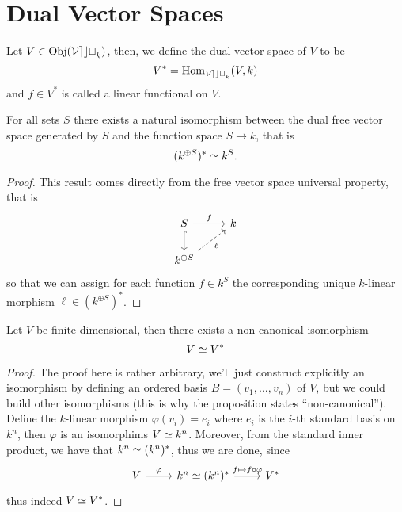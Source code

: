 \section{Dual Vector Spaces}

\begin{definition}
  Let \(V \in \operatorname{Obj}(\mathcal{Vect}_k)\), then, we define the dual vector space of
  \(V\) to be
  \[
    V^\ast = \operatorname{Hom}_{\mathcal{Vect}_k} (V, k)
  \] 
  and \(f \in V^\ast\) is called a linear functional on \(V\).
\end{definition}

\begin{proposition}
  For all sets \(S\) there exists a natural isomorphism between the dual free
  vector space generated by \(S\) and the function space \(S \to k\), that is
  \[
    (k^{\oplus S})^\ast \simeq k^S.
  \] 
\end{proposition}

\begin{proof}
  This result comes directly from the free vector space universal property, that
  is
  \[
    \begin{tikzcd}
      S \ar[r, "f"] \ar[d, hook] & k \\
      k^{\oplus S} \ar[ur, dashed, swap, "\ell"]
    \end{tikzcd}
  \] 
  so that we can assign for each function \(f \in k^S\) the corresponding unique
  \(k\)-linear morphism \(\ell \in (k^{\oplus S})^\ast\).
\end{proof}

\begin{proposition}\label{prop: finite dim vs iso dual vs}
  Let \(V\) be finite dimensional, then there exists a non-canonical isomorphism
  \[
    V \simeq V^\ast
  \] 
\end{proposition}

\begin{proof}
  The proof here is rather arbitrary, we'll just construct explicitly an
  isomorphism by defining an ordered basis \(B = (v_1, \dots, v_n)\) of \(V\),
  but we could build other isomorphisms (this is why the proposition states
  ``non-canonical''). Define the \(k\)-linear morphism \(\varphi(v_i) = e_i\) 
  where \(e_i\) is the \(i\)-th standard basis on \(k^n\), then \(\varphi\) is
  an isomorphims \(V \simeq k^n\). Moreover, from the standard inner product, we
  have that \(k^n \simeq (k^n)^\ast\), thus we are done, since 
  \[
    \begin{tikzcd}
      V \ar[r, "\varphi"] & k^n \iso (k^n)^\ast \ar[r, "f \mapsto f \circ
      \varphi"] &V^\ast
    \end{tikzcd}
  \] 
  thus indeed \(V \simeq V^\ast\).
\end{proof}

